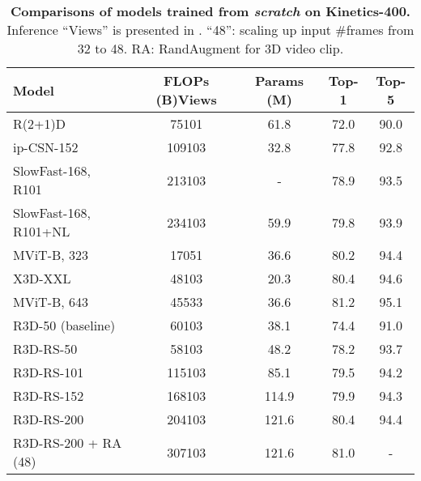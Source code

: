 \documentclass{article} \usepackage{iclr2021_conference,times}
\begin{document}
\setlength{\tabcolsep}{4pt}
\begin{table*}[t]
\centering
\begin{tabular}{l  | c | c | c c}
  \toprule
  Model  & FLOPs (B)Views & Params (M) & Top-1 & Top-5  \\
  \midrule
  R(2+1)D~\cite{r21d} & 75101 & 61.8 &  72.0 & 90.0 \\
  ip-CSN-152~\cite{Tran2019VideoCW} & 109103 & 32.8 &   77.8 & 92.8 \\
  SlowFast-168, R101~\cite{Feichtenhofer2019SlowFastNF} & 213103 & - &  78.9 & 93.5 \\
  SlowFast-168, R101+NL~\cite{Feichtenhofer2019SlowFastNF} & 234103 & 59.9 &  79.8 & 93.9 \\
  MViT-B, 323~\cite{Fan2021MultiscaleVT} &17051& 36.6 &  80.2 & 94.4 \\
  X3D-XXL~\cite{feichtenhofer2020x3d} & 48103 & 20.3 &  80.4 & 94.6 \\
  MViT-B, 643~\cite{Fan2021MultiscaleVT} & 45533& 36.6 &  81.2 & 95.1 \\
  \midrule
  R3D-50 (baseline) & 60103 & 38.1 &  74.4 & 91.0 \\
  R3D-RS-50  &  58103&  48.2 & 78.2 & 93.7 \\
  R3D-RS-101 &  115103 & 85.1 & 79.5 & 94.2 \\
  R3D-RS-152 & 168103 & 114.9 & 79.9 & 94.3\\
  R3D-RS-200 & 204103 & 121.6 & 80.4 & 94.4 \\
  R3D-RS-200 + RA (48) &  307103 & 121.6 & 81.0 & - \\
  \bottomrule
\end{tabular}
\vspace{1mm}
\caption{\small{
\textbf{Comparisons of models trained from \textit{scratch} on Kinetics-400.} 
Inference ``Views'' is presented in . 
``48'': scaling up input \#frames from 32 to 48. RA: RandAugment for 3D video clip.}}
\label{tab:k400results_sv} 
\end{table*}
\end{document}
